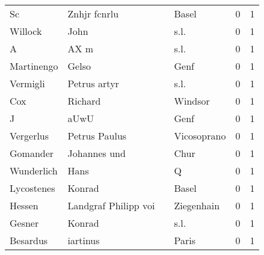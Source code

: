\begin{tabular}{llllrr}
                       Sc &                       Znhjr fcnrlu &             &                                       Basel &          0 &         1 \\
                  Willock &                               John &             &                                        s.l. &          0 &         1 \\
                        A &                               AX m &             &                                        s.l. &          0 &         1 \\
               Martinengo &                              Gelso &             &                                        Genf &          0 &         1 \\
                 Vermigli &                       Petrus artyr &             &                                        s.l. &          0 &         1 \\
                      Cox &                            Richard &             &                                     Windsor &          0 &         1 \\
                        J &                               aUwU &             &                                        Genf &          0 &         1 \\
                Vergerlus &                      Petrus Paulus &             &                                 Vicosoprano &          0 &         1 \\
                 Gomander &                       Johannes und &             &                                        Chur &          0 &         1 \\
               Wunderlich &                               Hans &             &                                           Q &          0 &         1 \\
               Lycostenes &                             Konrad &             &                                       Basel &          0 &         1 \\
                   Hessen &               Landgraf Philipp voi &             &                                  Ziegenhain &          0 &         1 \\
                   Gesner &                             Konrad &             &                                        s.l. &          0 &         1 \\
                 Besardus &                           iartinus &             &                                       Paris &          0 &         1 \\

\end{tabular}
